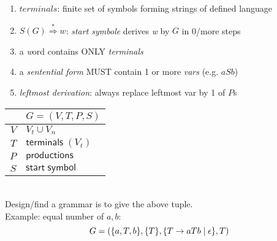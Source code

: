 \begin{minipage}{0.45\linewidth}
\begin{enumerate}
\item \(terminals\): finite set of symbols forming strings of defined language
\item \(S(G) \overset{*}{\Rightarrow} w\): \emph{start symbole} derives \emph{w} by \(G\) in 0/more steps
\item a \emph{w}ord contains ONLY \emph{terminals}
\item a \emph{sentential form} MUST contain 1 or more \emph{vars} (e.g. \(aSb\))
\item \emph{leftmost derivation}: always replace leftmost var by 1 of \(P\)s
\end{enumerate}
\end{minipage}
{\footnotesize
\begin{minipage}{0.5\linewidth}
  \centering
  \begin{tabular}{r|l}
    & $G = (V,T,P,S)$  \\
    \hline
    $V$ & $V_{t} \cup V_{n}$ \\
    $T$ & $\mathsf{terminals} \; (V_{t})$\\
    $P$ & $\mathsf{productions}$ \\
    $S$ & $\mathsf{start \; symbol}$\\
    \hline
\end{tabular}\\
Design/find a grammar is to give the above tuple.\\
Example: equal number of \(a, b\):
\[
  G = (\{a,T,b\},\{T\},\{T \rightarrow aTb \;|\; \epsilon\},T)
\]

\end{minipage}
}
